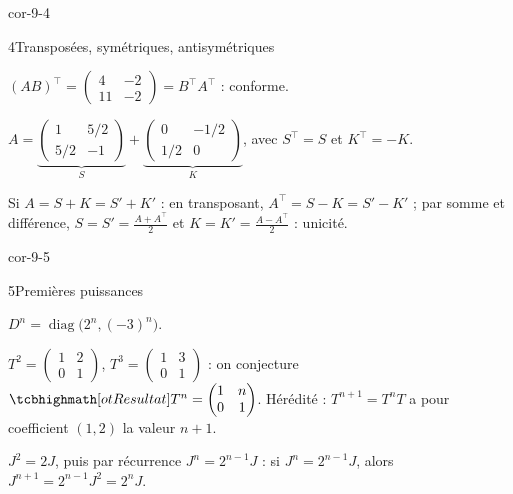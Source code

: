 \begin{blocLivre}{cor-9-4}
\begin{corrige}{4}{Transposées, symétriques, antisymétriques}
\begin{questions}
  \item $(AB)^{\top}=\begin{pmatrix}4&-2\\11&-2\end{pmatrix}
    =B^{\top}A^{\top}$ : conforme.
  \item $A=\underbrace{\begin{pmatrix}1&5/2\\5/2&-1\end{pmatrix}}_{S}
    +\underbrace{\begin{pmatrix}0&-1/2\\1/2&0\end{pmatrix}}_{K}$,
    avec $S^{\top}=S$ et $K^{\top}=-K$.
  \item Si $A=S+K=S'+K'$ : en transposant, $A^{\top}=S-K=S'-K'$ ; par
    somme et différence, $S=S'=\frac{A+A^{\top}}{2}$ et
    $K=K'=\frac{A-A^{\top}}{2}$ : unicité.
\end{questions}
\end{corrige}
\end{blocLivre}

\begin{blocLivre}{cor-9-5}
\begin{corrige}{5}{Premières puissances}
\begin{questions}
  \item $D^{n}=\operatorname{diag}\bigl(2^{n},(-3)^{n}\bigr)$.
  \item $T^{2}=\begin{pmatrix}1&2\\0&1\end{pmatrix}$,
    $T^{3}=\begin{pmatrix}1&3\\0&1\end{pmatrix}$ : on conjecture
    $\res{T^{n}=\begin{pmatrix}1&n\\0&1\end{pmatrix}}$. Hérédité :
    $T^{n+1}=T^{n}T$ a pour coefficient $(1,2)$ la valeur $n+1$.
  \item $J^{2}=2J$, puis par récurrence
    $J^{n}=2^{n-1}J$ : si $J^{n}=2^{n-1}J$, alors
    $J^{n+1}=2^{n-1}J^{2}=2^{n}J$.
\end{questions}
\end{corrige}
\end{blocLivre}

